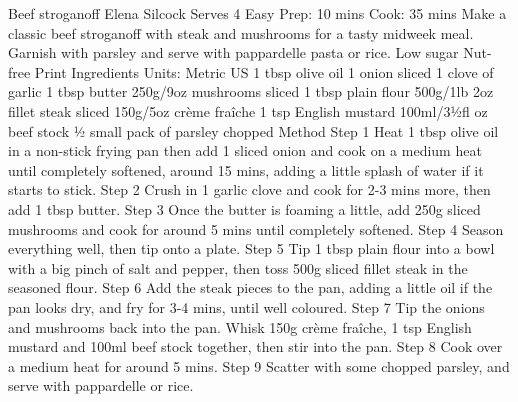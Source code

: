 Beef stroganoff Elena Silcock Serves 4 Easy Prep: 10 mins Cook: 35 mins Make a classic beef stroganoff with steak and mushrooms for a tasty midweek meal. Garnish with parsley and serve with pappardelle pasta or rice. Low sugar Nut-free Print Ingredients Units: Metric US 1 tbsp olive oil 1 onion sliced 1 clove of garlic 1 tbsp butter 250g/9oz mushrooms sliced 1 tbsp plain flour 500g/1lb 2oz fillet steak sliced 150g/5oz crème fraîche 1 tsp English mustard 100ml/3½fl oz beef stock ½ small pack of parsley chopped Method Step 1 Heat 1 tbsp olive oil in a non-stick frying pan then add 1 sliced onion and cook on a medium heat until completely softened, around 15 mins, adding a little splash of water if it starts to stick. Step 2 Crush in 1 garlic clove and cook for 2-3 mins more, then add 1 tbsp butter. Step 3 Once the butter is foaming a little, add 250g sliced mushrooms and cook for around 5 mins until completely softened. Step 4 Season everything well, then tip onto a plate. Step 5 Tip 1 tbsp plain flour into a bowl with a big pinch of salt and pepper, then toss 500g sliced fillet steak in the seasoned flour. Step 6 Add the steak pieces to the pan, adding a little oil if the pan looks dry, and fry for 3-4 mins, until well coloured. Step 7 Tip the onions and mushrooms back into the pan. Whisk 150g crème fraîche, 1 tsp English mustard and 100ml beef stock together, then stir into the pan. Step 8 Cook over a medium heat for around 5 mins. Step 9 Scatter with some chopped parsley, and serve with pappardelle or rice.
\par

